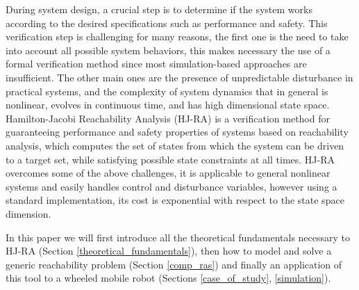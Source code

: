 During system design, a crucial step is to determine if the system works according to the desired specifications such as performance and safety. This verification step is challenging for many reasons, the first one is the need to take into account all possible system behaviors, this makes necessary the use of a formal verification method since most simulation-based approaches are insufficient. The other main ones are the presence of unpredictable disturbance in practical systems, and the complexity of system dynamics that in general is nonlinear, evolves in continuous time, and has high dimensional state space. 
Hamilton-Jacobi Reachability Analysis (HJ-RA) is a verification method for guaranteeing performance and safety properties of systems based on reachability analysis, which computes the set of states from which the system can be driven to a target set, while satisfying possible state constraints at all times. HJ-RA overcomes some of the above challenges, it is applicable to general nonlinear systems and easily handles control and disturbance variables, however using a standard implementation, its cost is exponential with respect to the state space dimension.

In this paper we will first introduce all the theoretical fundamentals necessary to HJ-RA (Section \ref{theoretical_fundamentals}), then how to model and solve a generic reachability problem (Section \ref{comp_ras}) and finally an application of this tool to a wheeled mobile robot (Sections \ref{case_of_study}, \ref{simulation}).